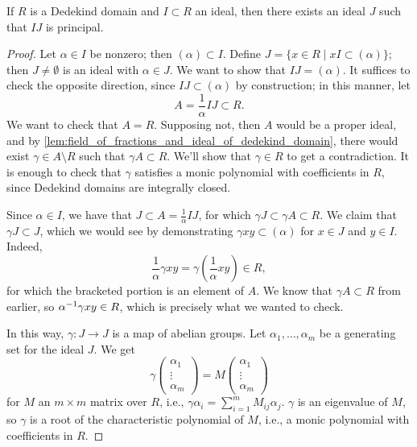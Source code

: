 \begin{theorem} \label{thm:dedekind_principal_ideal}
    If $R$ is a Dedekind domain and $I \subset R$ an ideal, then there exists an ideal $J$ such that $IJ$ is principal.
\end{theorem}
\begin{proof}
    Let $\alpha \in I$ be nonzero; then $(\alpha) \subset I$. Define $J = \{x \in R \mid x I \subset (\alpha)\}$; then $J \neq \emptyset$ is an ideal with $\alpha \in J$. We want to show that $IJ = (\alpha)$. It suffices to check the opposite direction, since $IJ \subset (\alpha)$ by construction; in this manner, let
    \[ A = \frac{1}{\alpha} IJ \subset R. \]
    We want to check that $A = R$. Supposing not, then $A$ would be a proper ideal, and by \ref{lem:field_of_fractions_and_ideal_of_dedekind_domain}, there would exist $\gamma \in A \setminus R$ such that $\gamma A \subset R$. We'll show that $\gamma \in R$ to get a contradiction. It is enough to check that $\gamma$ satisfies a monic polynomial with coefficients in $R$, since Dedekind domains are integrally closed.

    Since $\alpha \in I$, we have that $J \subset A = \frac{1}{\alpha} I J$, for which $\gamma J \subset \gamma A \subset R$. We claim that $\gamma J \subset J$, which we would see by demonstrating $\gamma x y \subset (\alpha)$ for $x \in J$ and $y \in I$. Indeed,
    \[ \frac{1}{\alpha} \gamma x y = \gamma \left(\frac{1}{\alpha} x y\right) \in R, \]
    for which the bracketed portion is an element of $A$. We know that $\gamma A \subset R$ from earlier, so $\alpha^{-1} \gamma x y \in R$, which is precisely what we wanted to check.

    \newpage
    In this way, $\gamma \colon J \to J$ is a map of abelian groups. Let $\alpha_1, \dots, \alpha_m$ be a generating set for the ideal $J$. We get
    \[ \gamma \begin{pmatrix} \alpha_1 \\ \vdots \\ \alpha_m \end{pmatrix} = M \begin{pmatrix} \alpha_1 \\ \vdots \\ \alpha_m \end{pmatrix} \]
    for $M$ an $m \times m$ matrix over $R$, i.e., $\gamma \alpha_i = \sum_{i=1}^m M_{ij} \alpha_j$. $\gamma$ is an eigenvalue of $M$, so $\gamma$ is a root of the characteristic polynomial of $M$, i.e., a monic polynomial with coefficients in $R$.
\end{proof}

